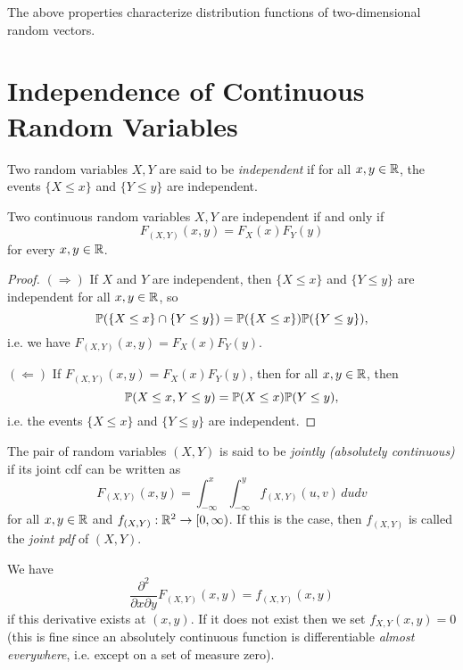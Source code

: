 \begin{remark}
  The above properties characterize distribution
  functions of two-dimensional random vectors.
\end{remark}

\section{Independence of Continuous Random Variables}
\begin{definition}
  Two random variables $X, Y$ are said to be
  \emph{independent}
  if for all $x, y \in \mathbb{R}$, the events
  $\{X \le x\}$ and $\{Y \le y\}$ are independent.
\end{definition}

\begin{prop}
  Two continuous random variables $X, Y$ are independent
  if and only if \[
    F_{(X, Y)}(x, y) = F_X(x) F_Y(y)
  \]
  for every $x, y \in \mathbb{R}$.
\end{prop}

\begin{proof}
  $(\Rightarrow)$ If $X$ and $Y$ are independent,
  then $\{X \le x\}$ and $\{Y \le y\}$ are independent
  for all $x, y \in \mathbb{R}$, so
  \[
    \mathbb{P}(\{X \le x\} \cap \{Y \le y\}) = \mathbb{P}(\{X \le x\}) \mathbb{P}(\{Y \le y\}),
  \]
  i.e. we have $F_{(X, Y)}(x, y) = F_X(x) F_Y(y)$.

  $(\Leftarrow)$ If $F_{(X, Y)}(x, y) = F_X(x) F_Y(y)$,
  then for all $x, y \in \mathbb{R}$, then
  \[
    \mathbb{P}(X \le x, Y \le y)
    = \mathbb{P}(X \le x) \mathbb{P}(Y \le y),
  \]
  i.e. the events $\{X \le x\}$ and $\{Y \le y\}$ are independent.
\end{proof}

\begin{definition}
  The pair of random variables $(X, Y)$
  is said to be \emph{jointly (absolutely continuous)}
  if its joint cdf can be written as
  \[
    F_{(X, Y)}(x, y) = \int_{-\infty}^x \int_{-\infty}^y f_{(X, Y)}(u, v) \, du dv
  \]
  for all $x, y \in \mathbb{R}$ and
  $f_{(X, Y)} : \mathbb{R}^2 \to [0, \infty)$. If this is the
  case, then $f_{(X, Y)}$ is called the \emph{joint pdf}
  of $(X, Y)$.
\end{definition}

\begin{remark}
  We have
  \[
    \frac{\partial^2}{\partial x \partial y} F_{(X, Y)}(x, y) = f_{(X, Y)}(x, y)
  \]
  if this derivative exists at $(x, y)$. If it
  does not exist then we set $f_{X, Y}(x, y) = 0$ (this is fine since an absolutely continuous function is
  differentiable \emph{almost everywhere}, i.e.
  except on a set of measure zero).
\end{remark}

